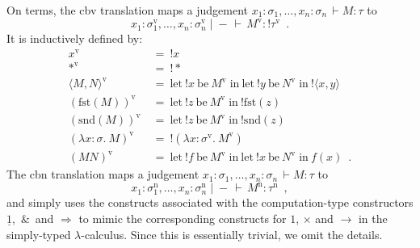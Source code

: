 \documentclass{LMCS}
\newcommand{\comptype}[1]{\underline{#1}}
\newcommand{\Cone}{\comptype{1}}
\newcommand{\Cprod}{\,\&\,}
\newcommand{\Cfun}{\Rightarrow}
\newcommand{\Cbang}[1]{{! #1}}
\newcommand{\In}[2]{#1 \colon  \! #2}
\newcommand{\rIn}[2]{#1 \colon  #2}
\newcommand{\Cj}[4]{#1 \mid  \! #2 \, \vdash \, \rIn{#3}{#4}}
\newcommand{\Vj}[3]{\Cj{#1}{{-}}{#2}{#3}}
\newcommand{\Vstar}{{*}}
\newcommand{\Vpair}[2]{\langle #1 , #2 \rangle}
\newcommand{\Vfst}[1]{\mathrm{fst}(#1)}
\newcommand{\Vsnd}[1]{\mathrm{snd}(#1)}
\newcommand{\Vlam}[3]{\lambda \In{#1}{#2}.\: #3}
\newcommand{\Vappl}[2]{#1(#2)}
\newcommand{\bang}[1]{{! #1}}
\newcommand{\banglet}[3]{\mathrm{let}\: {\bang #1}\:\mathrm{be}\:{#2} \;\mathrm{in}\: #3}
\newcommand{\Lone}{1}
\newcommand{\Lprod}{\times}
\newcommand{\Lfun}{\to}
\newcommand{\Lj}[3]{#1  \, \vdash  \rIn{#2}{#3}}
\newcommand{\Lstar}{*}
\newcommand{\Lpair}[2]{\langle #1 , #2 \rangle}
\newcommand{\Lfst}[1]{\mathrm{fst}(#1)}
\newcommand{\Lsnd}[1]{\mathrm{snd}(#1)}
\newcommand{\Llam}[3]{\lambda \In{#1}{#2}.\: #3}
\newcommand{\Lappl}[2]{#1  #2}
\newcommand{\cbv}[1]{#1^{\mathrm{v}}}
\newcommand{\cbn}[1]{#1^{\mathrm{n}}}
\begin{document}
On terms, the cbv translation maps a judgement 
$\Lj{\In{x_1}{\sigma_1}, \ldots, \In{x_n}{\sigma_n}}{M}{\tau}$ to
\[\Vj{\In{x_1}{\cbv{\sigma_1}}, \ldots, \In{x_n}{\cbv{\sigma_n}}}{\cbv{M}}{\Cbang{\cbv{\tau}}} \enspace .\]
It is inductively defined by:
\begin{align*}
\cbv{x} \: & = \: \bang{x} \\
\cbv{\Lstar} \: & = \: \bang{\Vstar} \\
\cbv{\Lpair{M}{N}} \: & = \: \banglet{x}{\cbv{M}}{\banglet{y}{\cbv{N}}{\bang{\Vpair{x}{y}}}} \\
\cbv{(\Lfst{M})} \: & = \: \banglet{z}{\cbv{M}}{\bang{\Vfst{z}}} \\
\cbv{(\Lsnd{M})} \: & = \: \banglet{z}{\cbv{M}}{\bang{\Vsnd{z}}} \\
\cbv{(\Llam{x}{\sigma}{M})} \: & = \: \bang{(\Vlam{x}{\cbv{\sigma}}{\cbv{M}})} \\
\cbv{(\Lappl{M}{N})} \: & = \: \banglet{f}{\cbv{M}}{\banglet{x}{\cbv{N}}{\Vappl{f}{x}}} \enspace .
\end{align*}
The cbn translation
maps a judgement 
$\Lj{\In{x_1}{\sigma_1}, \ldots, \In{x_n}{\sigma_n}}{M}{\tau}$ to
\[\Vj{\In{x_1}{\cbn{\sigma_1}}, \ldots, \In{x_n}{\cbn{\sigma_n}}}{\cbn{M}}{\cbn{\tau}} \enspace ,\]
and simply uses the constructs associated with the computation-type constructors
$\Cone$, $\Cprod$ and $\Cfun$ to mimic the corresponding constructs for $\Lone$, $\Lprod$ and $\Lfun$
in the simply-typed $\lambda$-calculus. Since this is essentially trivial, we omit the details.
\end{document}

